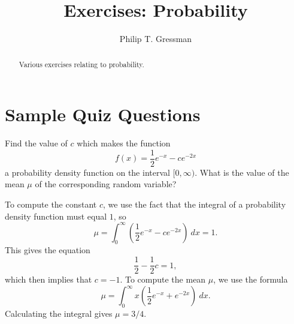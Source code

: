 \documentclass{ximera}
\title{Exercises: Probability}
\author{Philip T. Gressman}
\begin{document}
\begin{abstract}
Various exercises relating to probability.
\end{abstract}
\maketitle


\section*{Sample Quiz Questions}
\begin{question}%

Find the value of \(c\) which makes the function
\[f(x) = \frac{1}{2}e^{-x} - ce^{-2x}\]
a probability density function on the interval \([0, \infty)\). 
What is the value of the mean \(\mu\) of the corresponding random variable?
\begin{multiplechoice}
\end{multiplechoice}
\begin{feedback}
To compute the constant \(c\), we use the fact that the integral of a probability density function must equal \(1\), so 
\[ \mu = \int_{0}^{\infty} \left( \frac{1}{2}e^{-x} - ce^{-2x} \right) ~ dx = 1.\]
This gives the equation \[\frac{1}{2} - \frac{1}{2}c = 1,\]
which then implies that \(c = -1\). To compute the mean \(\mu\), we use the formula
\[ \mu = \int_{0}^{\infty} x \left( \frac{1}{2}e^{-x} + e^{-2x} \right) ~ dx.\]
 Calculating the integral gives \(\mu = 3/4.\)
\end{feedback}

\end{question}
\end{document}
